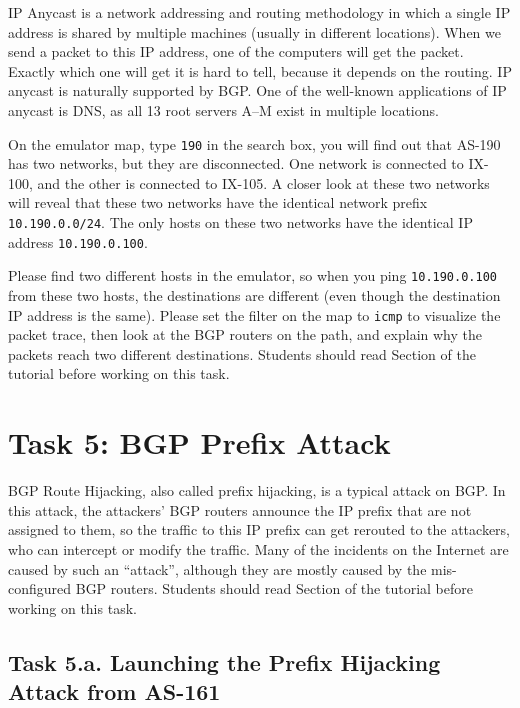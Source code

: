 IP Anycast is a network addressing and routing methodology in which a single
IP address is shared by multiple machines (usually in different locations).
When we send a packet to this IP address, one of the computers will get 
the packet. Exactly which one will get it is hard to tell, because it depends
on the routing. IP anycast is naturally supported by BGP. 
One of the well-known applications of IP anycast is DNS, 
as all 13 root servers A–M exist in multiple locations. 


On the emulator map, type \texttt{190} in the search box, you will find 
out that AS-190 has two networks, but they are disconnected. One network
is connected to IX-100, and the other is connected to IX-105. A closer 
look at these two networks will reveal that these two networks have the 
identical network prefix \texttt{10.190.0.0/24}. The only hosts on
these two networks have the identical IP address \texttt{10.190.0.100}. 

Please find two different hosts in the emulator, so 
when you ping \texttt{10.190.0.100} from these two hosts, 
the destinations are different (even though the destination
IP address is the same). Please set the filter on the map to
\texttt{icmp} to visualize the packet trace, then 
look at the BGP routers on the path, and explain why
the packets reach two different destinations. 
Students should read Section \ipanycast of the tutorial 
before working on this task.



\section{Task 5: BGP Prefix Attack} 

BGP Route Hijacking, also called prefix hijacking, is a typical
attack on BGP. In this attack, the attackers' BGP routers 
announce the IP prefix that are not assigned to them, so
the traffic to this IP prefix can get rerouted to the 
attackers, who can intercept or modify the traffic.
Many of the incidents on the Internet are caused by
such an ``attack'', although they are mostly caused 
by the mis-configured BGP routers.
Students should read Section \bgphijacking of the tutorial 
before working on this task.


\subsection{Task 5.a. Launching the Prefix Hijacking Attack from AS-161} 

